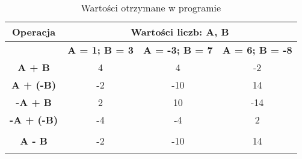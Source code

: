 \documentclass[12pt, a4paper, onside, polish]{article}				%
\begin{document}
\begin{table}[hbt!]
\caption{Wartości otrzymane w programie}
\centering
\begin{tabular}{|c|ccc|}
\hline
\rowcolor[HTML]{9B9B9B} 
Operacja                                   & \multicolumn{3}{c|}{\cellcolor[HTML]{9B9B9B}Wartości liczb: A, B}                                                                                                                         \\ \hline
                                           & \multicolumn{1}{c|}{\cellcolor[HTML]{EFEFEF}\textbf{A = 1; B = 3}} & \multicolumn{1}{c|}{\cellcolor[HTML]{EFEFEF}\textbf{A = -3; B = 7}} & \cellcolor[HTML]{EFEFEF}\textbf{A = 6; B = -8} \\ \hline
\rowcolor[HTML]{32CB00} 
\cellcolor[HTML]{EFEFEF}\textbf{A + B}     & \multicolumn{1}{c|}{\cellcolor[HTML]{32CB00}4}                     & \multicolumn{1}{c|}{\cellcolor[HTML]{32CB00}4}                      & -2                                             \\ \hline
\rowcolor[HTML]{32CB00} 
\cellcolor[HTML]{EFEFEF}\textbf{A + (-B)}  & \multicolumn{1}{c|}{\cellcolor[HTML]{32CB00}-2}                    & \multicolumn{1}{c|}{\cellcolor[HTML]{32CB00}-10}                    & 14                                             \\ \hline
\rowcolor[HTML]{32CB00} 
\cellcolor[HTML]{EFEFEF}\textbf{-A + B}    & \multicolumn{1}{c|}{\cellcolor[HTML]{32CB00}2}                     & \multicolumn{1}{c|}{\cellcolor[HTML]{32CB00}10}                     & -14                                            \\ \hline
\rowcolor[HTML]{32CB00} 
\cellcolor[HTML]{EFEFEF}\textbf{-A + (-B)} & \multicolumn{1}{c|}{\cellcolor[HTML]{32CB00}-4}                    & \multicolumn{1}{c|}{\cellcolor[HTML]{32CB00}-4}                     & 2                                              \\ \hline
\cellcolor[HTML]{EFEFEF}\textbf{}          & \multicolumn{1}{c|}{}                                              & \multicolumn{1}{c|}{}                                               &                                                \\ \hline
\rowcolor[HTML]{32CB00} 
\cellcolor[HTML]{EFEFEF}\textbf{A - B}     & \multicolumn{1}{c|}{\cellcolor[HTML]{32CB00}-2}                    & \multicolumn{1}{c|}{\cellcolor[HTML]{32CB00}-10}                    & 14                                             \\ \hline
\rowcolor[HTML]{32CB00} 

\end{tabular}
\end{table}
\end{document}
